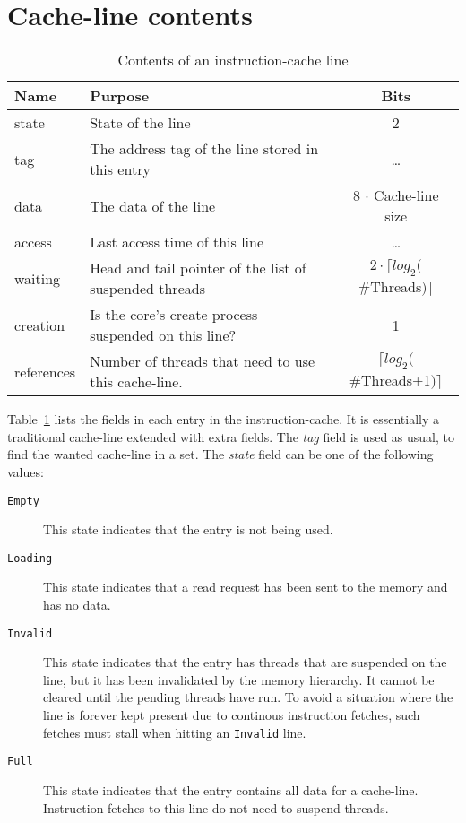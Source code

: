 \section{Cache-line contents}
\begin{table}
\begin{center}
\begin{tabular}{|l|l|c|}
\hline
Name & Purpose & Bits \\
\hline
\hline
state & State of the line & 2 \\
tag & The address tag of the line stored in this entry & \ldots \\
data & The data of the line & 8 $\cdot$ Cache-line size \\
access & Last access time of this line & \ldots \\
waiting & Head and tail pointer of the list of suspended threads & $2 \cdot \lceil log_2($\#Threads$) \rceil$ \\
creation & Is the core's create process suspended on this line? & 1 \\
references & Number of threads that need to use this cache-line. & $\lceil log_2($\#Threads+1$) \rceil$ \\
\hline
\end{tabular}
\caption{Contents of an instruction-cache line}
\label{table:icache_contents}
\end{center}
\end{table}

Table~\ref{table:icache_contents} lists the fields in each entry in the instruction-cache. It is essentially a traditional cache-line extended with extra fields. The \emph{tag} field is used as usual, to find the wanted cache-line in a set. The \emph{state} field can be one of the following values:
\begin{description}
\item[{\tt Empty}]
This state indicates that the entry is not being used.
\item[{\tt Loading}]
This state indicates that a read request has been sent to the memory and has no data.
\item[{\tt Invalid}]
This state indicates that the entry has threads that are suspended on the line, but it has been invalidated by the memory hierarchy. It cannot be cleared until the pending threads have run. To avoid a situation where the line is forever kept present due to continous instruction fetches, such fetches must stall when hitting an {\tt Invalid} line.
\item[{\tt Full}]
This state indicates that the entry contains all data for a cache-line. Instruction fetches to this line do not need to suspend threads.
\end{description}

